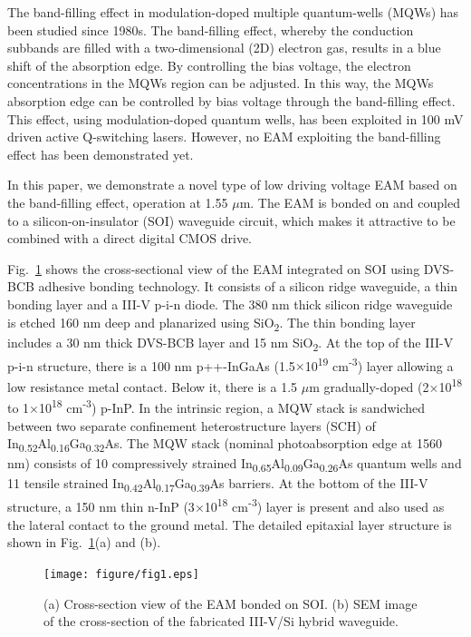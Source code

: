 \documentclass[aip,apl,reprint,a4paper]{revtex4-1}
\def\SP#1{\textsuperscript{#1}}
\def\SB#1{\textsubscript{#1}}
\begin{document}
The band-filling effect in modulation-doped multiple quantum-wells (MQWs) has been studied since 1980s.\cite{livescu1988free} The band-filling effect, whereby the conduction subbands are filled with a two-dimensional (2D) electron gas, results in a blue shift of the absorption edge. By controlling the bias voltage, the electron concentrations in the MQWs region can be adjusted. In this way, the MQWs absorption edge can be controlled by bias voltage through the band-filling effect. This effect, using modulation-doped quantum wells, has been exploited in 100 mV driven active Q-switching lasers.\cite{kalinovsky1993free} However, no EAM exploiting the band-filling effect has been demonstrated yet.


In this paper, we demonstrate a novel type of low driving voltage EAM based on the band-filling effect, operation at 1.55 $\mu$m. The EAM is bonded on and coupled to a silicon-on-insulator (SOI) waveguide circuit, which makes it attractive to be combined with a direct digital CMOS drive.


Fig.~\ref{fig:1} shows the cross-sectional view of the EAM integrated on SOI using DVS-BCB adhesive bonding technology.\cite{roelkensiii-v-on-silicon2015} It consists of a silicon ridge waveguide, a thin bonding layer and a III-V p-i-n diode. The 380 nm thick silicon ridge waveguide is etched 160 nm deep and planarized using SiO\SB{2}. The thin bonding layer includes a 30 nm thick DVS-BCB layer and 15 nm SiO\SB{2}. At the top of the III-V p-i-n structure, there is a 100 nm p++-InGaAs (1.5$\times$10\SP{19} cm\SP{-3}) layer allowing a low resistance metal contact. Below it, there is a 1.5 $\mu$m gradually-doped (2$\times$10\SP{18} to 1$\times$10\SP{18} cm\SP{-3}) p-InP. In the intrinsic region, a MQW stack is sandwiched between two separate confinement heterostructure layers (SCH) of In\SB{0.52}Al\SB{0.16}Ga\SB{0.32}As. The MQW stack (nominal photoabsorption edge at 1560 nm) consists of 10 compressively strained In\SB{0.65}Al\SB{0.09}Ga\SB{0.26}As quantum wells and 11 tensile strained In\SB{0.42}Al\SB{0.17}Ga\SB{0.39}As barriers. At the bottom of the III-V structure, a 150 nm thin n-InP (3$\times$10\SP{18} cm\SP{-3}) layer is present and also used as the lateral contact to the ground metal.  The detailed epitaxial layer structure is shown in Fig.~\ref{fig:1}(a) and (b).

\begin{figure}
	\texttt{[image: figure/fig1.eps]}%
	\caption{\label{fig:1} (a) Cross-section view of the EAM bonded on SOI. (b) SEM image of the cross-section of the fabricated III-V/Si hybrid waveguide.}
\end{figure}
\end{document}
